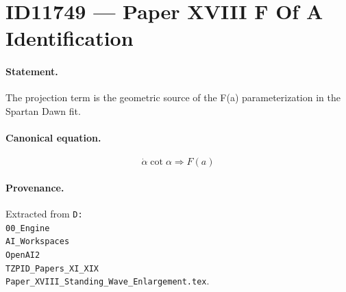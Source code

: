 \section*{ID11749 --- Paper XVIII F Of A Identification}

\paragraph{Statement.}
The projection term is the geometric source of the F(a) parameterization in the Spartan Dawn fit.

\paragraph{Canonical equation.}
\[
\dot\alpha\cot\alpha\Rightarrow F(a)
\]

\paragraph{Provenance.}
Extracted from \texttt{D:\\00\_Engine\\AI\_Workspaces\\OpenAI2\\TZPID\_Papers\_XI\_XIX\\Paper\_XVIII\_Standing\_Wave\_Enlargement.tex}.
